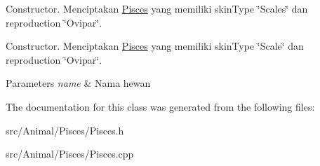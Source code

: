 Constructor. Menciptakan \hyperlink{classPisces}{Pisces} yang memiliki skin\+Type \char`\"{}\+Scales\char`\"{} dan reproduction \char`\"{}\+Ovipar\char`\"{}. 

Constructor. Menciptakan \hyperlink{classPisces}{Pisces} yang memiliki skin\+Type \char`\"{}\+Scale\char`\"{} dan reproduction \char`\"{}\+Ovipar\char`\"{}.


\begin{DoxyParams}{Parameters}
{\em name} & Nama hewan \\
\hline
\end{DoxyParams}


The documentation for this class was generated from the following files\+:\begin{DoxyCompactItemize}
\item 
src/\+Animal/\+Pisces/Pisces.\+h\item 
src/\+Animal/\+Pisces/Pisces.\+cpp\end{DoxyCompactItemize}
